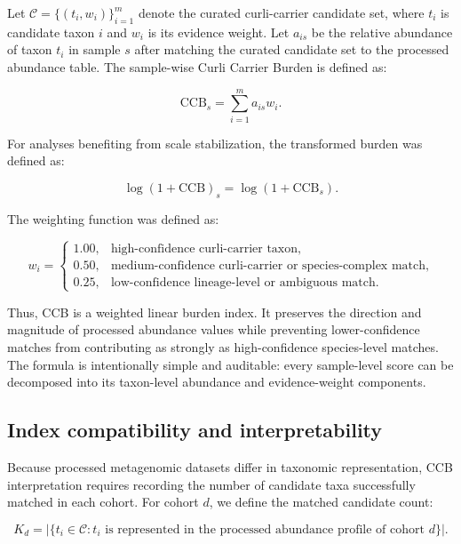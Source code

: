 \documentclass[11pt]{article}
\newcommand{\CCB}{\mathrm{CCB}}
\newcommand{\logCCB}{\log(1+\mathrm{CCB})}
\begin{document}
Let $\mathcal{C}=\{(t_i,w_i)\}_{i=1}^{m}$ denote the curated curli-carrier candidate set, where $t_i$ is candidate taxon $i$ and $w_i$ is its evidence weight. Let $a_{is}$ be the relative abundance of taxon $t_i$ in sample $s$ after matching the curated candidate set to the processed abundance table. The sample-wise Curli Carrier Burden is defined as:

\begin{equation}
\CCB_s = \sum_{i=1}^{m} a_{is}w_i.
\label{eq:ccb}
\end{equation}

For analyses benefiting from scale stabilization, the transformed burden was defined as:

\begin{equation}
\logCCB_s = \log(1+\CCB_s).
\label{eq:logccb}
\end{equation}

The weighting function was defined as:

\begin{equation}
w_i =
\begin{cases}
1.00, & \text{high-confidence curli-carrier taxon},\\
0.50, & \text{medium-confidence curli-carrier or species-complex match},\\
0.25, & \text{low-confidence lineage-level or ambiguous match}.
\end{cases}
\label{eq:weights}
\end{equation}

Thus, CCB is a weighted linear burden index. It preserves the direction and magnitude of processed abundance values while preventing lower-confidence matches from contributing as strongly as high-confidence species-level matches. The formula is intentionally simple and auditable: every sample-level score can be decomposed into its taxon-level abundance and evidence-weight components.

\subsection*{Index compatibility and interpretability}

Because processed metagenomic datasets differ in taxonomic representation, CCB interpretation requires recording the number of candidate taxa successfully matched in each cohort. For cohort $d$, we define the matched candidate count:

\begin{equation}
K_d = |\{t_i \in \mathcal{C}: t_i \text{ is represented in the processed abundance profile of cohort } d\}|.
\label{eq:compat}
\end{equation}
\end{document}
